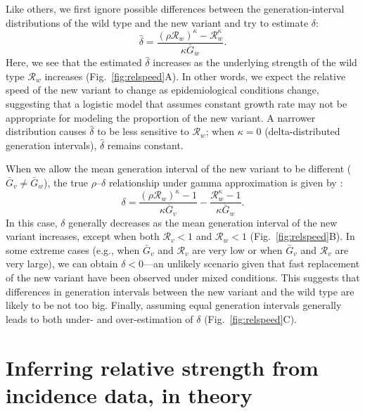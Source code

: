 \documentclass[12pt]{article}
\newcommand{\fref}[1]{Fig.~\ref{fig:#1}}
\newcommand{\RR}{\ensuremath{{\mathcal R}}\xspace}
\begin{document}
Like others, we first ignore possible differences between the generation-interval distributions of the wild type and the new variant and try to estimate $\delta$:
\begin{equation}
\hat{\delta} = \frac{(\rho \RR_w)^{\kappa} - \RR_w^{\kappa}}{\kappa \bar{G}_w}.
\end{equation}
Here, we see that the estimated $\hat{\delta}$ increases as the underlying strength of the wild type $\RR_w$ increases (\fref{relspeed}A).
In other words, we expect the relative speed of the new variant to change as epidemiological conditions change, suggesting that a logistic model that assumes constant growth rate may not be appropriate for modeling the proportion of the new variant.
A narrower distribution causes $\hat{\delta}$ to be less sensitive to $\RR_w$;
when $\kappa = 0$ (delta-distributed generation intervals), $\hat{\delta}$ remains constant.

When we allow the mean generation interval of the new variant to be different ($\bar{G}_v \neq \bar{G}_w$), the true $\rho$--$\delta$ relationship under gamma approximation is given by \citep{park2019practical}:
\begin{equation}
\delta = \frac{(\rho \RR_w)^{\kappa} - 1}{\kappa \bar{G}_v} - \frac{\RR_w^{\kappa} - 1}{\kappa \bar{G}_w}.
\end{equation}
In this case, $\delta$ generally decreases as the mean generation interval of the new variant increases, except when both $\RR_v < 1$ and $\RR_w < 1$ (\fref{relspeed}B).
In some extreme cases (e.g., when $\bar{G}_v$ and $\RR_v$ are very low or when $\bar{G}_v$ and $\RR_v$ are very large), we can obtain $\delta < 0$---an unlikely scenario given that fast replacement of the new variant have been observed under mixed conditions.
This suggests that differences in generation intervals between the new variant and the wild type are likely to be not too big.
Finally, assuming equal generation intervals generally leads to both under- and over-estimation of $\delta$ (\fref{relspeed}C).

\section{Inferring relative strength from incidence data, in theory}
\end{document}
